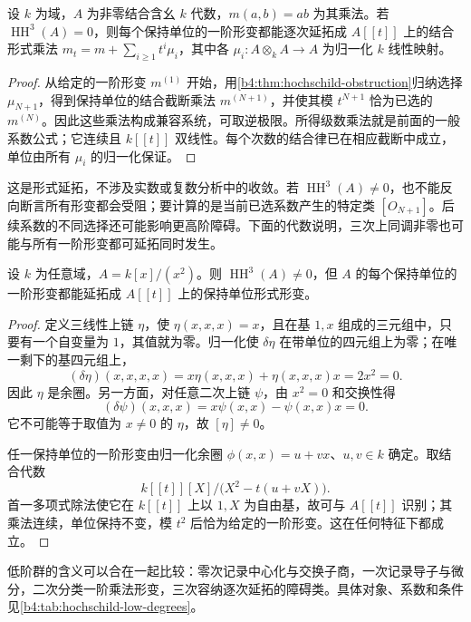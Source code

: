 \begin{corollary}\label{b4:cor:hh3-unobstructed}
	设 \(k\) 为域，\(A\) 为非零结合含幺 \(k\) 代数，\(m(a,b)=ab\) 为其乘法。若 \(\operatorname{HH}^3(A)=0\)，则每个保持单位的一阶形变都能逐次延拓成 \(A[\![t]\!]\) 上的结合形式乘法 \(m_t=m+\sum_{i\ge1}t^i\mu_i\)，其中各 \(\mu_i:A\otimes_kA\to A\) 为归一化 \(k\) 线性映射。
\end{corollary}
\begin{proof}
	从给定的一阶形变 \(m^{(1)}\) 开始，用\cref{b4:thm:hochschild-obstruction}归纳选择 \(\mu_{N+1}\)，得到保持单位的结合截断乘法 \(m^{(N+1)}\)，并使其模 \(t^{N+1}\) 恰为已选的 \(m^{(N)}\)。因此这些乘法构成兼容系统，可取逆极限。所得级数乘法就是前面的一般系数公式；它连续且 \(k[\![t]\!]\) 双线性。每个次数的结合律已在相应截断中成立，单位由所有 \(\mu_i\) 的归一化保证。
\end{proof}

这是形式延拓，不涉及实数或复数分析中的收敛。若 \(\operatorname{HH}^3(A)\ne0\)，也不能反向断言所有形变都会受阻；要计算的是当前已选系数产生的特定类 \([O_{N+1}]\)。后续系数的不同选择还可能影响更高阶障碍。下面的代数说明，三次上同调非零也可能与所有一阶形变都可延拓同时发生。

\begin{proposition}\label{b4:prop:dual-numbers-unobstructed}
	设 \(k\) 为任意域，\(A=k[x]/(x^2)\)。则 \(\operatorname{HH}^3(A)\ne0\)，但 \(A\) 的每个保持单位的一阶形变都能延拓成 \(A[\![t]\!]\) 上的保持单位形式形变。
\end{proposition}
\begin{proof}
	定义三线性上链 \(\eta\)，使 \(\eta(x,x,x)=x\)，且在基 \(1,x\) 组成的三元组中，只要有一个自变量为 \(1\)，其值就为零。归一化使 \(\delta\eta\) 在带单位的四元组上为零；在唯一剩下的基四元组上，
	\[
		(\delta\eta)(x,x,x,x) =x\eta(x,x,x)+\eta(x,x,x)x=2x^2=0.
	\]
	因此 \(\eta\) 是余圈。另一方面，对任意二次上链 \(\psi\)，由 \(x^2=0\) 和交换性得
	\[
		(\delta\psi)(x,x,x)=x\psi(x,x)-\psi(x,x)x=0.
	\]
	它不可能等于取值为 \(x\ne0\) 的 \(\eta\)，故 \([\eta]\ne0\)。

	任一保持单位的一阶形变由归一化余圈 \(\phi(x,x)=u+vx\)、\(u,v\in k\) 确定。取结合代数
	\[
		k[\![t]\!][X]/\bigl(X^2-t(u+vX)\bigr).
	\]
	首一多项式除法使它在 \(k[\![t]\!]\) 上以 \(1,X\) 为自由基，故可与 \(A[\![t]\!]\) 识别；其乘法连续，单位保持不变，模 \(t^2\) 后恰为给定的一阶形变。这在任何特征下都成立。
\end{proof}

\ProseParagraphBreak
低阶群的含义可以合在一起比较：零次记录中心化与交换子商，一次记录导子与微分，二次分类一阶乘法形变，三次容纳逐次延拓的障碍类。具体对象、系数和条件见\cref{b4:tab:hochschild-low-degrees}。

